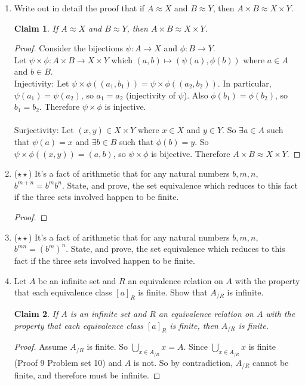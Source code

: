 \documentclass[11pt]{letter}
\newtheorem{claim}{Claim}
\theoremstyle{definition}
\begin{document}
\begin{description}
\begin{enumerate}
          
		
        \item Write out in detail the proof that if $A\approx X$ and $B\approx Y$, then $A\times B\approx X\times Y$.
          \begin{claim}
            If $A\approx X$ and $B\approx Y$, then $A\times B\approx X\times Y$.
          \end{claim}
          \begin{proof}
            Consider the bijections $\psi: A\rightarrow X$ and $\phi: B\rightarrow Y$.\\
            Let $\psi\times\phi:A\times B \rightarrow X\times Y$ which $(a,b)\mapsto (\psi(a),\phi(b))$ where $a\in A$ and $b\in B$. \\
            Injectivity: Let $\psi\times\phi((a_1,b_1))=\psi\times\phi((a_2,b_2))$. In particular, $\psi(a_1)=\psi(a_2)$, so $a_1=a_2$ (injectivity of $\psi$). Also $\phi(b_1)=\phi(b_2)$, so $b_1=b_2$. Therefore $\psi\times\phi$ is injective. \\ \\
            Surjectivity: Let $(x,y)\in X\times Y$ where $x\in X$ and $y\in Y$. So $\exists a\in A$ such that $\psi(a)=x$ and $\exists b\in B$ such that $\phi(b)=y$. So $\psi\times\phi((x,y))=(a,b)$, so $\psi\times\phi$ is bijective. Therefore $A\times B\approx X\times Y$.
          \end{proof}
          
		
        \item ($\star\star$) It's a fact of arithmetic that for any natural numbers $b,m,n$, $b^{m+n}=b^mb^n$. State, and prove, the set equivalence which reduces to this fact if the three sets involved happen to be finite.
          \begin{proof}
            
          \end{proof}
          
		
		\item ($\star\star$) It's a fact of arithmetic that for any natural numbers $b,m,n$, $b^{mn}=(b^m)^n$. State, and prove, the set equivalence which reduces to this fact if the three sets involved happen to be finite.

	
		\item Let $A$ be an infinite set and $R$ an equivalence relation on $A$ with the property that each equivalence class $[a]_R$ is finite. Show that $A_{/R}$ is infinite.
                  \begin{claim}
                    If $A$ is an infinite set and $R$ an equivalence relation on $A$ with the property that each equivalence class $[a]_R$ is finite, then $A_{/R}$ is finite.
                  \end{claim}
                  \begin{proof}
                    Assume $A_{/R}$ is finite. So $\bigcup_{x\in A_{/R}}x=A$. Since $\bigcup_{x\in A_{/R}}x$ is finite (Proof 9 Problem set 10) and $A$ is not. So by contradiction, $A_{/R}$ cannot be finite, and therefore must be infinite.
                  \end{proof}
                  		

\end{enumerate}
\end{description}
\end{document}
